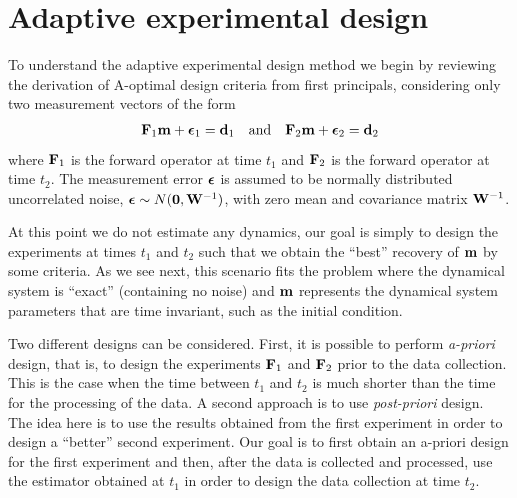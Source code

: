 \documentclass[final,leqno,onefignum,onetabnum]{siamltexmm}
\begin{document}
\section{Adaptive experimental design}
\label{sec: Adaptive}
To understand the adaptive experimental design method we  begin by reviewing the derivation of A-optimal
 design criteria from first principals, considering only two measurement vectors  of the form
%
\begin{align}
\label{data}
\bfF_{1} \bfm + \bfepsilon_1 = \bfd_{1}\quad {\rm and} \quad \bfF_{2} \bfm + \bfepsilon_2 = \bfd_{2}
\end{align}
%
where ${\bf{F}}_{1}$ is the forward operator at time $t_{1}$ and ${\bf{F}}_{2}$ is the forward operator 
at time $t_{2}$. The measurement error ${\boldsymbol \epsilon}$ is assumed to be normally distributed uncorrelated noise, $ {\boldsymbol \epsilon}\sim N({\bf 0},{\bf{W}}^{-1})$, with zero mean and covariance matrix ${\bf{W}}^{-1}$. 

At this point we do not estimate any dynamics,
our goal is simply to design the experiments at times $t_{1}$ and $t_{2}$ such that we obtain the ``best''
recovery of ${\bf{m}}$ by some criteria.
As we see next, this scenario fits the problem where the dynamical system is ``exact'' (containing
no noise) and ${\bf{m}}$ represents the dynamical system parameters that are time invariant, such as the initial condition.

Two different designs can be considered. First, it is possible to perform {\em a-priori} design, that is,
to design the experiments ${\bf{F}}_{1}$ and ${\bf{F}}_{2}$ prior to the data collection. This is the case
when the time between $t_{1}$ and $t_{2}$ is much shorter than the time for the processing
of the data. A second approach is to use {\em post-priori} design. The idea here is to use the 
results obtained from the first experiment in order to design a ``better'' second experiment.
Our goal is to first obtain an a-priori design for the first experiment
and then, after the data is collected and processed, use the estimator
obtained at $t_{1}$ in order  to design the data collection
at time $t_{2}$.
\end{document}
